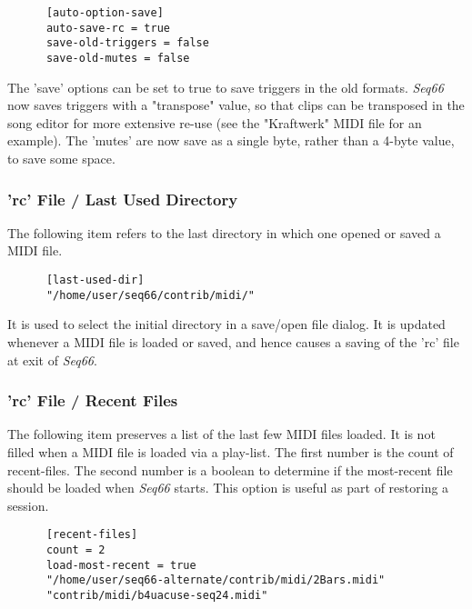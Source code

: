    \begin{verbatim}
      [auto-option-save]
      auto-save-rc = true
      save-old-triggers = false
      save-old-mutes = false
   \end{verbatim}

   The 'save' options can be set to true to save triggers in the old formats.
   \textsl{Seq66} now saves triggers with a "transpose" value, so that
   clips can be transposed in the song editor for more extensive re-use
   (see the "Kraftwerk" MIDI file for an example).
   The 'mutes' are now save as a single byte, rather than a 4-byte value, to
   save some space.

\subsubsection{'rc' File / Last Used Directory}
\label{subsubsec:configuration_rc_last_used_dir}

   The following item refers to the last directory in which one opened or
   saved a MIDI file.

   \begin{verbatim}
      [last-used-dir]
      "/home/user/seq66/contrib/midi/"
   \end{verbatim}

   It is used to select the initial directory in a save/open file dialog.
   It is updated whenever a MIDI file is loaded or saved, and
   hence causes a saving of the 'rc' file at exit of \textsl{Seq66}.

\subsubsection{'rc' File / Recent Files}
\label{subsubsec:configuration_rc_recent_files}

   The following item preserves a list of the last few MIDI files loaded.
   It is not filled when a MIDI file is loaded via a play-list.
   The first number is the count of recent-files.
   The second number is a boolean to determine if the most-recent file
   should be loaded when \textsl{Seq66} starts.
   This option is useful as part of restoring a session.

   \begin{verbatim}
      [recent-files]
      count = 2
      load-most-recent = true
      "/home/user/seq66-alternate/contrib/midi/2Bars.midi"
      "contrib/midi/b4uacuse-seq24.midi"
   \end{verbatim}

